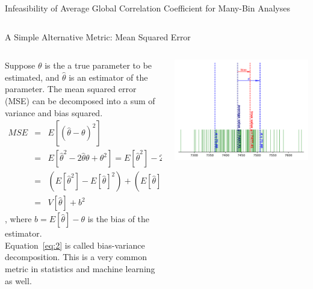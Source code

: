 \documentclass[aspectratio=169]{beamer}
\begin{document}
\begin{frame}{Infeasibility of Average Global Correlation Coefficient for Many-Bin Analyses}
\begin{columns}
\begin{column}{.35\textwidth}
    \end{column}
  \end{columns}
\end{frame}

\begin{frame}{A Simple Alternative Metric: Mean Squared Error}
  \begin{columns}
    \begin{column}{.5\textwidth}
      \footnotesize
			Suppose $\theta$ is the a true parameter to be estimated, and $\hat{\theta}$ is an estimator of the parameter.
			The mean squared error (MSE) can be decomposed into a sum of variance and bias squared.
			\begin{eqnarray} \label{eq:2}
			MSE &=& E[(\hat{\theta}-\theta)^2]\nonumber\\
			&=& E[\hat{\theta}^2-2\hat{\theta}\theta+\theta^2] = E[\hat{\theta}^2] -2\theta E[\hat{\theta}]+\theta^2 \nonumber\\
			&=& (E[\hat{\theta}^2]-E[\hat{\theta}]^2)+(E[\hat{\theta}]^2-2\theta E[\hat{\theta}]+\theta^2) \nonumber\\
			&=& V[\hat{\theta}]+b^2
			\end{eqnarray}
			, where $b=E[\hat{\theta}]-\theta$ is the bias of the estimator.\\
			Equation~\ref{eq:2} is called bias-variance decomposition.
			\vfill
			This is a very common metric in statistics and machine learning as well.
	\end{column}
    \begin{column}{.5\textwidth}
      \includegraphics[width=\textwidth]{figures/mse_illustration_iter20.pdf}
    \end{column}
  \end{columns}
\end{frame}
\end{document}
